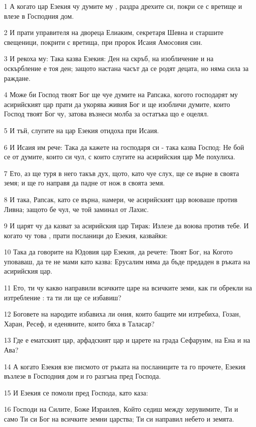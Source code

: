 \par 1 А когато цар Езекия чу думите му , раздра дрехите си, покри се с вретище и влезе в Господния дом.
\par 2 И прати управителя на двореца Елиаким, секретаря Шевна и старшите свещеници, покрити с вретища, при пророк Исаия Амосовия син.
\par 3 И рекоха му: Така казва Езекия: Ден на скръб, на изобличение и на оскърбление е тоя ден; защото настана часът да се родят децата, но няма сила за раждане.
\par 4 Може би Господ твоят Бог ще чуе думите на Рапсака, когото господарят му асирийският цар прати да укорява живия Бог и ще изобличи думите, които Господ твоят Бог чу, затова възнеси молба за остатъка що е оцелял.
\par 5 И тъй, слугите на цар Езекия отидоха при Исаия.
\par 6 И Исаия им рече: Така да кажете на господаря си - така казва Господ: Не бой се от думите, които си чул, с които слугите на асирийския цар Ме похулиха.
\par 7 Ето, аз ще туря в него такъв дух, щото, като чуе слух, ще се върне в своята земя; и ще го направя да падне от нож в своята земя.
\par 8 И така, Рапсак, като се върна, намери, че асирийският цар воюваше против Ливна; защото бе чул, че той заминал от Лахис.
\par 9 И царят чу да казват за асирийския цар Тирак: Излезе да воюва против тебе. И когато чу това , прати посланици до Езекия, казвайки:
\par 10 Така да говорите на Юдовия цар Езекия, да речете: Твоят Бог, на Когото уповаваш, да те не мами като казва: Ерусалим няма да бъде предаден в ръката на асирийския цар.
\par 11 Ето, ти чу какво направили всичките царе на всичките земи, как ги обрекли на изтребление : та ти ли ще се избавиш?
\par 12 Боговете на народите избавиха ли ония, които бащите ми изтребиха, Гозан, Харан, Ресеф, и еденяните, които бяха в Таласар?
\par 13 Где е ематският цар, арфадският цар и царете на града Сефаруим, на Ена и на Ава?
\par 14 А когато Езекия взе писмото от ръката на посланиците та го прочете, Езекия възлезе в Господния дом и го разгъна пред Господа.
\par 15 И Езекия се помоли пред Господа, като каза:
\par 16 Господи на Силите, Боже Израилев, Който седиш между херувимите, Ти и само Ти си Бог на всичките земни царства; Ти си направил небето и земята.
